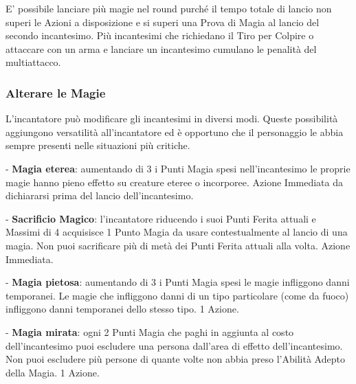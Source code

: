 \begin{multicols}{2}
E' possibile lanciare più magie nel round purché il tempo totale di lancio non superi le Azioni a disposizione e si superi una Prova di Magia al lancio del secondo incantesimo. Più incantesimi che richiedano il Tiro per Colpire o attaccare con un arma e lanciare un incantesimo cumulano le penalità del multiattacco.

\subsubsection{Alterare le Magie}\label{magiealteraremagie}

L'incantatore può modificare gli incantesimi in diversi modi. Queste possibilità aggiungono versatilità all'incantatore ed è opportuno che il personaggio le abbia sempre presenti nelle situazioni più critiche.


- \textbf{Magia eterea}: aumentando di 3 i Punti Magia spesi nell'incantesimo le proprie magie hanno pieno effetto su creature eteree o incorporee. Azione Immediata da dichiararsi prima del lancio dell'incantesimo.

- \textbf{Sacrificio Magico}: l'incantatore riducendo i suoi Punti Ferita attuali e Massimi di 4 acquisisce 1 Punto Magia da usare contestualmente al lancio di una magia. Non puoi sacrificare più di metà dei Punti Ferita attuali alla volta. Azione Immediata.

- \textbf{Magia pietosa}: aumentando di 3 i Punti Magia spesi le magie infliggono danni temporanei. Le magie che infliggono danni di un tipo particolare (come da fuoco) infliggono danni temporanei dello stesso tipo. 1 Azione.

- \textbf{Magia mirata}: ogni 2 Punti Magia che paghi in aggiunta al costo dell'incantesimo puoi escludere una persona dall'area di effetto dell'incantesimo. Non puoi escludere più persone di quante volte non abbia preso l'Abilità Adepto della Magia. 1 Azione. %


\end{multicols}
